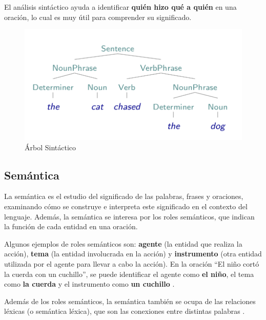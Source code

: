El análisis sintáctico ayuda a identificar \textbf{quién hizo qué a quién} en una oración, lo cual es muy útil para comprender su significado.

\begin{figure}[h]
	\centering
	\includegraphics[scale = 0.3]{pics/parseTree1.png}
	\caption{Árbol Sintáctico}
	\label{fig:arbol_sintactico}
\end{figure}




\subsection{Semántica}

La semántica es el estudio del significado de las palabras, frases y oraciones, examinando cómo se construye e interpreta este significado en el contexto del lenguaje. Además, la semántica se interesa por los roles semánticos, que indican la función de cada entidad en una oración.  

\begin{example}
Algunos ejemplos de roles semánticos son: \textcolor[rgb]{0.00,0.00,1.00}{\textbf{agente}} (la entidad que realiza la acción), \textcolor[rgb]{1.00,0.00,0.00}{\textbf{tema}} (la entidad involucrada en la acción) y \textcolor[rgb]{0.00,1.00,0.00}{\textbf{instrumento}} (otra entidad utilizada por el agente para llevar a cabo la acción). En la oración ``El niño cortó la cuerda con un cuchillo'', se puede identificar el agente como \textcolor[rgb]{0.00,0.00,1.00}{\textbf{el niño}}, el tema como \textcolor[rgb]{1.00,0.00,0.00}{\textbf{la cuerda}} y el instrumento como \textcolor[rgb]{0.00,1.00,0.00}{\textbf{un cuchillo}} \cite{JohnsonMLSS}. 
\end{example}



Además de los roles semánticos, la semántica también se ocupa de las relaciones léxicas (o semántica léxica), que son las conexiones entre distintas palabras \cite{yule2016study}.

